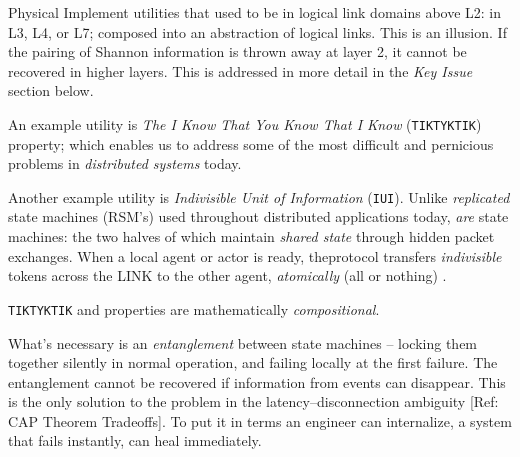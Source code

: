 \documentclass[../OAE-SPEC-MAIN.tex]{subfiles}
\begin{document}
Physical \LINKs Implement utilities that used to be in logical link domains above L2: in  L3, L4, or L7;  composed into an abstraction of logical links. This is an illusion. If the pairing of Shannon information is thrown away at layer 2, it cannot be recovered in higher layers. This is addressed in more detail in the \emph{Key Issue} section below.

An example \LINK utility is \emph{The I Know That You Know That I Know} (\texttt{TIK\hspace{1pt}TYK\hspace{1pt}TIK}) property; which  enables us to address some of the most difficult and pernicious problems in \emph{distributed systems} today. 

Another example \LINK utility is \emph{Indivisible Unit of Information} (\texttt{IUI}). Unlike \emph{replicated} state machines (RSM's) used throughout distributed applications today, \LINKs \emph{are} state machines: the two halves of which maintain \emph{shared state} through hidden packet exchanges.  When a local agent or actor is ready, the\IUI protocol transfers \emph{indivisible}
tokens across the LINK to  the other agent, \emph{atomically} (all or nothing)
. 
 
\noindent  \texttt{TIK\hspace{1pt}TYK\hspace{1pt}TIK} and \IUI properties are mathematically \emph{compositional}. 

What's necessary is an \emph{entanglement} between state machines -- locking them together silently in normal operation, and failing locally at the first failure.  The entanglement cannot be recovered if information from events can disappear. This is the only solution to the problem in the  latency--disconnection ambiguity [Ref: CAP Theorem Tradeoffs]. To put it in terms an engineer can internalize, a system that fails instantly, can heal immediately.
\end{document}

